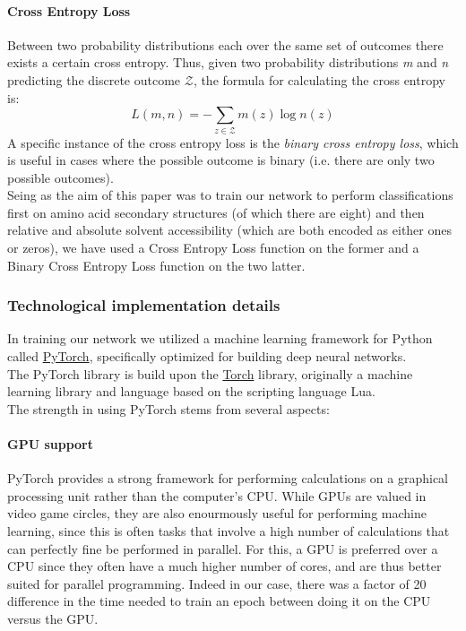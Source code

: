 \begin{multicols}{2}


\paragraph{Cross Entropy Loss}
Between two probability distributions each over the same set of outcomes there exists a certain cross entropy.
Thus, given two probability distributions \textit{m} and \textit{n} predicting the discrete outcome $\mathcal{Z}$, the formula for calculating the cross entropy is:
$$L ( m , n ) = - \sum _ { z \in \mathcal { Z } } m ( z ) \log n ( z )$$
A specific instance of the cross entropy loss is the \textit{binary cross entropy loss}, which is useful in cases where the possible outcome is binary (i.e. there are only two possible outcomes). 
\\
Seing as the aim of this paper was to train our network to perform classifications first on amino acid secondary structures (of which there are eight) and then relative and absolute solvent accessibility (which are both encoded as either ones or zeros), we have used a Cross Entropy Loss function on the former and a Binary Cross Entropy Loss function on the two latter.


\subsubsection{Technological implementation details}
In training our network we utilized a machine learning framework for Python called \href{https://pytorch.org/}{PyTorch}, specifically optimized for building deep neural networks. \\
The PyTorch library is build upon the \href{http://torch.ch/}{Torch} library, originally a machine learning library and language based on the scripting language Lua.\\
The strength in using PyTorch stems from several aspects:
\paragraph{GPU support}
PyTorch provides a strong framework for performing calculations on a graphical processing unit rather than the computer's CPU. While GPUs are valued in video game circles, they are also enourmously useful for performing machine learning, since this is often tasks that involve a high number of calculations that can perfectly fine be performed in parallel. For this, a GPU is preferred over a CPU since they often have a much higher number of cores, and are thus better suited for parallel programming. Indeed in our case, there was a factor of 20 difference in the time needed to train an epoch between doing it on the CPU versus the GPU.

\end{multicols}
